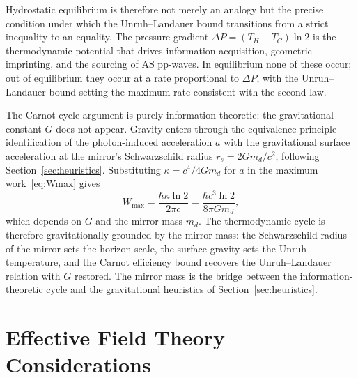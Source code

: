 \documentclass[12pt,a4paper]{article}
\begin{document}
Hydrostatic equilibrium is therefore not merely an analogy 
but the precise condition under which the Unruh--Landauer 
bound transitions from a strict inequality to an equality. 
The pressure gradient $\Delta P = (T_H - T_C)\ln 2$ is the 
thermodynamic potential that drives information acquisition, 
geometric imprinting, and the sourcing of AS pp-waves. 
In equilibrium none of these occur; out of equilibrium 
they occur at a rate proportional to $\Delta P$, with the 
Unruh--Landauer bound setting the maximum rate consistent 
with the second law.

The Carnot cycle argument is purely information-theoretic: 
the gravitational constant $G$ does not appear. Gravity 
enters through the equivalence principle identification of 
the photon-induced acceleration $a$ with the gravitational 
surface acceleration at the mirror's Schwarzschild radius 
$r_s = 2Gm_d/c^2$, following Section~\ref{sec:heuristics}. 
Substituting $\kappa = c^4/4Gm_d$ for $a$ in the maximum 
work~\eqref{eq:Wmax} gives
%
\begin{equation}
W_{\max} = \frac{\hbar\kappa\ln 2}{2\pi c} 
         = \frac{\hbar c^3\ln 2}{8\pi Gm_d},
\end{equation}
%
which depends on $G$ and the mirror mass $m_d$. The 
thermodynamic cycle is therefore gravitationally grounded 
by the mirror mass: the Schwarzschild radius of the mirror 
sets the horizon scale, the surface gravity sets the Unruh 
temperature, and the Carnot efficiency bound recovers the 
Unruh--Landauer relation with $G$ restored. The mirror mass 
is the bridge between the information-theoretic cycle and 
the gravitational heuristics of Section~\ref{sec:heuristics}.

\section{Effective Field Theory Considerations}
\label{sec:eft}

\end{document}
